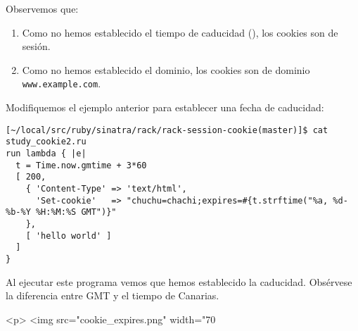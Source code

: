 Observemos que:
\begin{enumerate}
\item 
Como no hemos establecido el tiempo de caducidad (), los cookies son de sesión.
\item 
Como no hemos establecido el dominio, los cookies son de dominio \verb|www.example.com|.
\end{enumerate}


Modifiquemos el ejemplo anterior para establecer una fecha de caducidad:

\begin{verbatim}
[~/local/src/ruby/sinatra/rack/rack-session-cookie(master)]$ cat study_cookie2.ru 
run lambda { |e|
  t = Time.now.gmtime + 3*60
  [ 200, 
    { 'Content-Type' => 'text/html',
      'Set-cookie'   => "chuchu=chachi;expires=#{t.strftime("%a, %d-%b-%Y %H:%M:%S GMT")}"
    }, 
    [ 'hello world' ]
  ]
}
\end{verbatim}


Al ejecutar este programa vemos que hemos establecido la caducidad. Obsérvese
la diferencia entre GMT y el tiempo de Canarias.

\begin{rawhtml}
<p>
<img src="cookie_expires.png" width="70%
\end{rawhtml}


